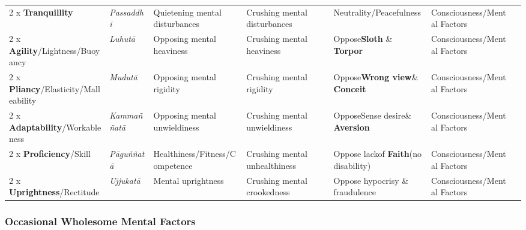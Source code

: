 \documentclass[a4 paper, 12pt]{article}
\begin{document}
\begin{tabular}{P{0.21\textwidth} | C{.13\textwidth} C{.165\textwidth} C{0.165\textwidth} C{0.165\textwidth} C{0.165\textwidth} m{0mm}}
2 x \textbf{Tranquillity} & \textit{Passaddhi} & Quietening mental disturbances & Crushing mental disturbances & Neutrality/\newline Peacefulness & Consciousness/\newline Mental Factors &\\[9mm]
2 x \textbf{Agility}/\newline Lightness/Buoyancy & \textit{Luhutā} & Opposing mental heaviness & Crushing mental heaviness & Oppose\newline \textbf{Sloth} \& \textbf{Torpor} & Consciousness/\newline Mental Factors &\\[9mm]
2 x \textbf{Pliancy}/\newline Elasticity/Malleability & \textit{Mudutā} & Opposing mental rigidity & Crushing mental rigidity & Oppose\newline \textbf{Wrong view}\newline \& \textbf{Conceit} & Consciousness/\newline Mental Factors &\\[9mm]
2 x \textbf{Adaptability}/\newline Workableness & \textit{Kammaññatā} & Opposing mental unwieldiness & Crushing mental unwieldiness & Oppose\newline Sense desire\newline \& \textbf{Aversion} & Consciousness/\newline Mental Factors &\\[9mm]
2 x \textbf{Proficiency}/\newline Skill & \textit{Pāguññatā} & Healthiness/\newline Fitness/\newline Competence & Crushing mental unhealthiness & Oppose lack\newline of \textbf{Faith}\newline (no disability) & Consciousness/\newline Mental Factors &\\[9mm]
2 x \textbf{Uprightness}/\newline Rectitude & \textit{Ujjukatā} & Mental uprightness & Crushing mental crookedness & Oppose hypocrisy \& fraudulence  & Consciousness/\newline Mental Factors &\\[9mm]
\bottomrule
\end{tabular} 

\newpage

\subsubsection*{Occasional Wholesome Mental Factors}
\end{document}
